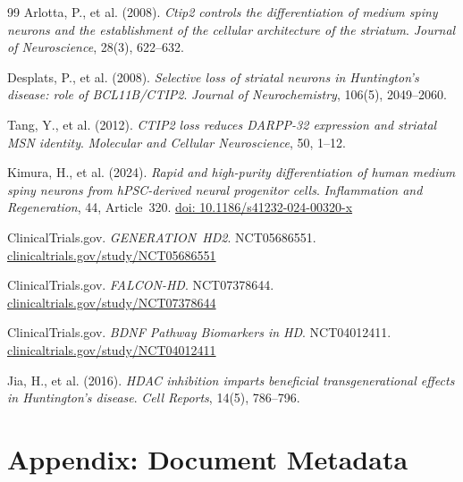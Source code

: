 \documentclass[12pt,a4paper]{article}
\begin{document}
\begin{thebibliography}{99}
Arlotta, P., et al. (2008).
\textit{Ctip2 controls the differentiation of medium spiny
neurons and the establishment of the cellular architecture
of the striatum}.
\textit{Journal of Neuroscience}, 28(3), 622--632.

Desplats, P., et al. (2008).
\textit{Selective loss of striatal neurons in Huntington's
disease: role of BCL11B/CTIP2}.
\textit{Journal of Neurochemistry}, 106(5), 2049--2060.

Tang, Y., et al. (2012).
\textit{CTIP2 loss reduces DARPP-32 expression and striatal
MSN identity}.
\textit{Molecular and Cellular Neuroscience}, 50, 1--12.

Kimura, H., et al. (2024).
\textit{Rapid and high-purity differentiation of human
medium spiny neurons from hPSC-derived neural progenitor
cells}.
\textit{Inflammation and Regeneration}, 44, Article~320.
\href{https://doi.org/10.1186/s41232-024-00320-x}%
{doi: 10.1186/s41232-024-00320-x}

ClinicalTrials.gov.
\textit{GENERATION~HD2}. NCT05686551.
\href{https://clinicaltrials.gov/study/NCT05686551}%
{clinicaltrials.gov/study/NCT05686551}

ClinicalTrials.gov.
\textit{FALCON-HD}. NCT07378644.
\href{https://clinicaltrials.gov/study/NCT07378644}%
{clinicaltrials.gov/study/NCT07378644}

ClinicalTrials.gov.
\textit{BDNF Pathway Biomarkers in HD}. NCT04012411.
\href{https://clinicaltrials.gov/study/NCT04012411}%
{clinicaltrials.gov/study/NCT04012411}

Jia, H., et al. (2016).
\textit{HDAC inhibition imparts beneficial transgenerational
effects in Huntington's disease}.
\textit{Cell Reports}, 14(5), 786--796.

\end{thebibliography}

\newpage
\section*{Appendix: Document Metadata}
\end{document}
